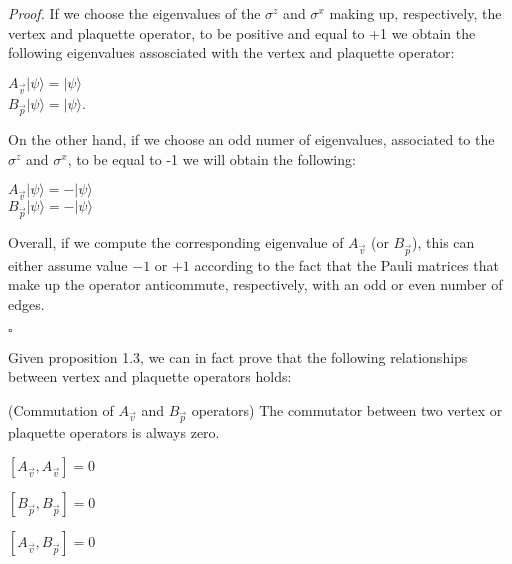 \documentclass{Configuration_Files/PoliMi3i_thesis}
\begin{document}
\textit{Proof.}\newline
If we choose the eigenvalues of the $\sigma^z$ and $\sigma^x$ making up, respectively, the vertex and plaquette operator, to be positive and equal to +1 we obtain the following eigenvalues assosciated with the vertex and plaquette operator:

\begin{center}
	$A_{\vec{v}} |\psi\rangle = |\psi\rangle$ \\
	$B_{\vec{p}} |\psi\rangle = |\psi\rangle$.
\end{center}

On the other hand, if we choose an odd numer of eigenvalues, associated to the $\sigma^z$ and $\sigma^x$, to be equal to -1 we will obtain the following:

\begin{center}
	$A_{\vec{v}} |\psi\rangle = -|\psi\rangle$ \\
	$B_{\vec{p}} |\psi\rangle = -|\psi\rangle$
\end{center}

Overall, if we compute the corresponding eigenvalue of $A_{\vec{v}}$ (or $B_{\vec{p}}$), this can either assume value $-1$ or $+1$ according to the fact that the Pauli matrices that make up the operator anticommute, respectively, with an odd or even number of edges.

\hfill $\square$

Given proposition 1.3, we can in fact prove that the following relationships between vertex and plaquette operators holds:

\begin{proposition} (Commutation of $A_{\vec{v}}$ and $B_{\vec{p}}$ operators) The commutator between two vertex or plaquette operators is always zero.

\begin{center}
	$[A_{\vec{v}},A_{\vec{v}}]=0$ 
\end{center}

\begin{center}
	$[B_{\vec{p}},B_{\vec{p}}]=0$ 
\end{center}

\begin{center}
	$[A_{\vec{v}},B_{\vec{p}}]=0$ 
\end{center}
	
\end{proposition}


\end{document}
